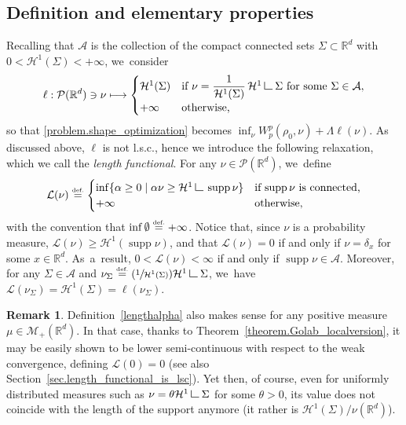 \documentclass[10pt]{amsart}
\newcommand\mto{\mathchoice{\longmapsto}{\mapsto}{\mapsto}{\mapsto}}
\newcommand{\Psfrac}[2]{(\sfrac{#1}{#2})}
\theoremstyle{definition}
\newtheorem{remark}[theorem]{Remark}
\newcommand{\eqdef}{\ensuremath{\stackrel{\mbox{\upshape\tiny def.}}{=}}}
\newcommand\LM[1]{\hbox{\vrule width.5pt \vbox to#1pt{\vfill \hrule width#1pt height.5pt}}}
\newcommand\LL{{\mathchoice {\>\LM7\>}{\>\LM7\>}{\,\LM5\,}{\,\LM{3.35}\,}}}
\newcommand{\mres}{\LL}
\newcommand\cH{\mathcal{H}}
\newcommand{\RR}{\mathbb{R}}
\DeclareMathOperator{\supp}{supp}
\newcommand{\enscond}[2]{\{#1 \mid #2\} }
\begin{document}
\subsection{Definition and elementary properties}\label{subsec.deflength}
Recalling that $\mathcal{A}$ is the collection of the compact connected sets $\Sigma \subset \RR^d$ with $0<\cH^1(\Sigma)<+\infty$, we~consider
\begin{equation}\label{eq:defl}
\ell : \mathcal{P}(\RR^d) \ni \nu \mto
\begin{cases}
\cH^1(\Sigma) & \text{if $\nu=\dfrac{1}{\cH^1(\Sigma)}\,\cH^1\mres \Sigma$ for some $\Sigma \in \mathcal{A}$},\\
+\infty& \text{otherwise,}
\end{cases}
\end{equation}
so that \eqref{problem.shape_optimization} becomes $\inf_\nu W_p^p(\rho_0, \nu) + \Lambda\ell(\nu)$. As discussed above, $\ell$ is not l.s.c., hence we introduce the following relaxation, which we call the \emph{length functional}. For any $\nu \in \mathcal{P}(\RR^d)$, we~define
\begin{equation}
\mathcal{L}(\nu)
\eqdef
\begin{cases}
\inf \enscond{\alpha \ge 0}{\alpha \nu \ge \cH^1\mres \supp \nu} & \mbox{if $\supp \nu$ is connected,}\\
+\infty & \mbox{otherwise,}
\end{cases}\label{lengthalpha}
\end{equation}
with the convention that $\inf \emptyset \eqdef +\infty$. Notice that, since $\nu$ is a probability measure, $\mathcal{L}(\nu)\geq \cH^1(\supp \nu)$, and that $\mathcal{L}(\nu)=0$ if and only if $\nu = \delta_x$ for some $x \in \RR^d$. As~a~result, $0<\mathcal{L}(\nu) < \infty$ if and only if $\supp \nu \in \mathcal{A}$. Moreover, for any $\Sigma \in \mathcal{A}$ and $ \nu_\Sigma\eqdef\Psfrac{1}{\cH^1(\Sigma)} \cH^1\mres \Sigma$, we~have $\mathcal{L}(\nu_\Sigma) = \cH^1(\Sigma)=\ell(\nu_\Sigma)$.

\begin{remark}
Definition~\eqref{lengthalpha} also makes sense for any positive measure $\mu \in \mathcal{M}_+(\RR^d)$. In that case, thanks to Theorem~\ref{theorem.Golab_localversion}, it may be easily shown to be
lower semi-continuous with respect to the weak convergence,
defining $\mathcal{L}(0)=0$ (see also Section~\ref{sec.length_functional_is_lsc}).
Yet then, of course, even for uniformly distributed measures such as $\nu = \theta\cH^1\mres \Sigma$ for some $\theta> 0$, its value does not coincide with the length of the support anymore (it rather is $\cH^1(\Sigma)/\nu(\RR^d)$).
\end{remark}
\end{document}

